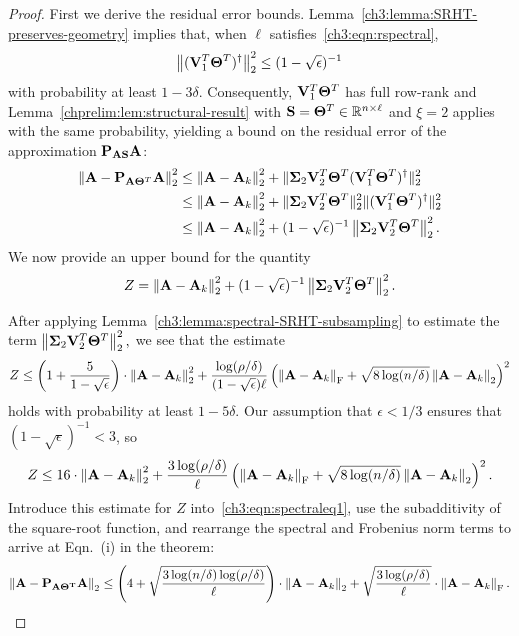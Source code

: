 \begin{proof}
First we derive the residual error bounds. Lemma~\ref{ch3:lemma:SRHT-preserves-geometry} implies that, when 
$\ell$ satisfies~\eqref{ch3:eqn:rspectral},
$$
  \left\| ( \mathbf{V}_1 ^T \mathbf{\Theta} ^T)^\dagger \right\|_2^2 \leq 
  (1 - \sqrt{\epsilon})^{-1}
$$
with probability at least $1 - 3\delta.$ Consequently, 
$\mathbf{V}_1 ^T \mathbf{\Theta} ^T$ has full row-rank and 
Lemma~\ref{chprelim:lem:structural-result}
with $\mathbf{S} = \mathbf{\Theta}^T \in \mathbb{R}^{n \times \ell}$ and 
$\xi=2$ applies with the same probability, yielding a bound on the residual
error of the approximation $\mathbf{P}_{\mathbf{A} \mathbf{S}} \mathbf{A}$:
\begin{align}
 \left\|\mathbf{A} - \mathbf{P}_{\mathbf{A}\mathbf{\Theta}^T} \mathbf{A} \right\|_2^2 & \leq \left\|\mathbf{A} - \mathbf{A}_k\right\|_2^2 + 
             \|\mathbf{\Sigma}_2\mathbf{V}_2^T\mathbf{\Theta}^T(\mathbf{V}_1^T\mathbf{\Theta}^T)^\dagger\|_2^2 \notag \\
 & \leq \left\|\mathbf{A} - \mathbf{A}_k\right\|_2^2 + 
             \|\mathbf{\Sigma}_2\mathbf{V}_2^T\mathbf{\Theta}^T\|_2^2 \|(\mathbf{V}_1^T\mathbf{\Theta}^T)^\dagger\|_2^2 \notag \\
 & \leq \left\|\mathbf{A} - \mathbf{A}_k\right\|_2^2 + (1-\sqrt{\epsilon})^{-1} 
 \left\|\mathbf{\Sigma}_2 \mathbf{V}_2 ^T \mathbf{\Theta} ^T\right\|_2^2. \label{ch3:eqn:spectraleq1}
\end{align}
We now provide an upper bound for the quantity
\[
 Z = \left\|\mathbf{A} - \mathbf{A}_k\right\|_2^2 + (1-\sqrt{\epsilon})^{-1} 
\left\|\mathbf{\Sigma}_2 \mathbf{V}_2 ^T \mathbf{\Theta} ^T\right\|_2^2.
\]

After applying Lemma~\ref{ch3:lemma:spectral-SRHT-subsampling} to estimate the 
term $\left\|\mathbf{\Sigma}_2 \mathbf{V}_2^T \mathbf{\Theta}^T\right\|_2^2,$ we see that the estimate
\[
Z \leq \left(1 + \frac{5}{1-\sqrt{\epsilon}}\right) \cdot 
 \left\|\mathbf{A} - \mathbf{A}_k\right\|_2^2 + 
 \frac{ \log (\rho/\delta)}{(1-\sqrt{\epsilon}) \ell} 
 \left( \left\|\mathbf{A} - \mathbf{A}_k\right\|_\mathrm{F} + 
 \sqrt{8 \log(n/\delta)} \left\|\mathbf{A} - \mathbf{A}_k\right\|_2 \right)^2
\]
holds with probability at least $1 - 5\delta.$ Our assumption that 
$\epsilon < 1/3$ ensures that $(1-\sqrt{\epsilon})^{-1} < 3$, so
\begin{equation}
\label{ch3:eqn:spectralZest}
Z \leq 16 \cdot \left\|\mathbf{A} - \mathbf{A}_k\right\|_2^2 + 
\frac{ 3 \log (\rho/\delta)} {\ell} 
\left( \left\|\mathbf{A} - \mathbf{A}_k\right\|_\mathrm{F} + 
  \sqrt{8 \log(n/\delta)} \left\|\mathbf{A} - \mathbf{A}_k\right\|_2 \right)^2.
\end{equation}
Introduce this estimate for $Z$ into~\eqref{ch3:eqn:spectraleq1}, use the subadditivity
of the square-root function, and rearrange the spectral and Frobenius norm
terms to arrive at Eqn.~(i) in the theorem:
\[
 \left\|\mathbf{A} - \mathbf{P}_{\mathbf{\mathbf{A} \mathbf{\Theta}^T}} \mathbf{A}\right\|_2 \leq \left(4 +
 \sqrt{\frac{3 \log(n/\delta)\log(\rho/\delta)}{\ell}} \right) \cdot 
   \left\|\mathbf{A} - \mathbf{A}_k\right\|_2 +
 \sqrt{\frac{3 \log(\rho/\delta)}{\ell}} \cdot \left\|\mathbf{A} - \mathbf{A}_k\right\|_\mathrm{F}.
\]


\end{proof}
